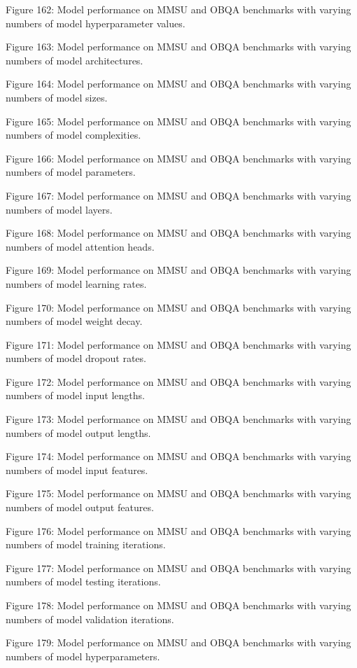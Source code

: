         Figure 162: Model performance on MMSU and OBQA benchmarks with varying numbers of model hyperparameter values.

        Figure 163: Model performance on MMSU and OBQA benchmarks with varying numbers of model architectures.

        Figure 164: Model performance on MMSU and OBQA benchmarks with varying numbers of model sizes.

        Figure 165: Model performance on MMSU and OBQA benchmarks with varying numbers of model complexities.

        Figure 166: Model performance on MMSU and OBQA benchmarks with varying numbers of model parameters.

        Figure 167: Model performance on MMSU and OBQA benchmarks with varying numbers of model layers.

        Figure 168: Model performance on MMSU and OBQA benchmarks with varying numbers of model attention heads.

        Figure 169: Model performance on MMSU and OBQA benchmarks with varying numbers of model learning rates.

        Figure 170: Model performance on MMSU and OBQA benchmarks with varying numbers of model weight decay.

        Figure 171: Model performance on MMSU and OBQA benchmarks with varying numbers of model dropout rates.

        Figure 172: Model performance on MMSU and OBQA benchmarks with varying numbers of model input lengths.

        Figure 173: Model performance on MMSU and OBQA benchmarks with varying numbers of model output lengths.

        Figure 174: Model performance on MMSU and OBQA benchmarks with varying numbers of model input features.

        Figure 175: Model performance on MMSU and OBQA benchmarks with varying numbers of model output features.

        Figure 176: Model performance on MMSU and OBQA benchmarks with varying numbers of model training iterations.

        Figure 177: Model performance on MMSU and OBQA benchmarks with varying numbers of model testing iterations.

        Figure 178: Model performance on MMSU and OBQA benchmarks with varying numbers of model validation iterations.

        Figure 179: Model performance on MMSU and OBQA benchmarks with varying numbers of model hyperparameters.


